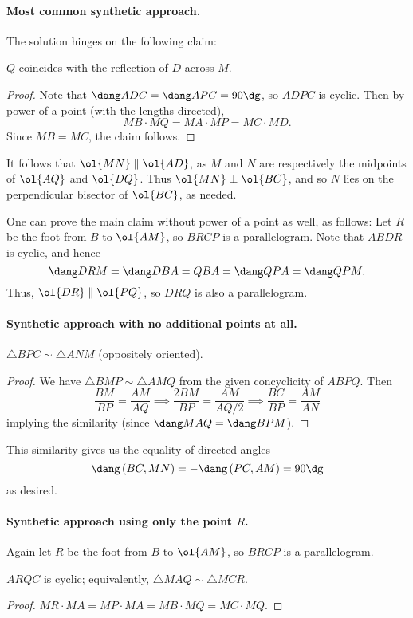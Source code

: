 \documentclass[11pt]{scrartcl}
\begin{document}
\paragraph{Most common synthetic approach.}
The solution hinges on the following claim:
\begin{claim*}
  $Q$ coincides with the reflection of $D$ across $M$.
\end{claim*}
\begin{proof}
  Note that $\dang ADC = \dang APC = 90\dg$, so $ADPC$ is cyclic.
  Then by power of a point (with the lengths directed),
  \[ MB \cdot MQ = MA \cdot MP = MC \cdot MD. \]
  Since $MB = MC$, the claim follows.
\end{proof}
It follows that $\ol{MN} \parallel \ol{AD}$,
as $M$ and $N$ are respectively the midpoints of $\ol{AQ}$ and $\ol{DQ}$.
Thus $\ol{MN} \perp \ol{BC}$,
and so $N$ lies on the perpendicular bisector of $\ol{BC}$, as needed.
\begin{remark*}
  One can prove the main claim without power of a point as well, as follows:
  Let $R$ be the foot from $B$ to $\ol{AM}$, so $BRCP$ is a parallelogram.
  Note that $ABDR$ is cyclic, and hence
  \[ \dang DRM = \dang DBA = QBA = \dang QPA = \dang QPM. \]
  Thus, $\ol{DR} \parallel \ol{PQ}$, so $DRQ$ is also a parallelogram.
\end{remark*}

\paragraph{Synthetic approach with no additional points at all.}
\begin{claim*}
  $\triangle BPC \sim \triangle ANM$ (oppositely oriented).
\end{claim*}
\begin{proof}
  We have $\triangle BMP \sim \triangle AMQ$ from the given concyclicity of $ABPQ$.
  Then
  \[ \frac{BM}{BP} = \frac{AM}{AQ} \implies
    \frac{2BM}{BP} = \frac{AM}{AQ/2} \implies
    \frac{BC}{BP} = \frac{AM}{AN} \]
  implying the similarity (since $\dang MAQ = \dang BPM$).
\end{proof}
This similarity gives us the equality of directed angles
\[ \dang \left( BC, MN \right) = -\dang \left( PC, AM  \right) = 90\dg \]
as desired.

\paragraph{Synthetic approach using only the point $R$.}
Again let $R$ be the foot from $B$ to $\ol{AM}$, so $BRCP$ is a parallelogram.
\begin{claim*}
  $ARQC$ is cyclic; equivalently, $\triangle MAQ \sim \triangle MCR$.
\end{claim*}
\begin{proof}
  $MR \cdot MA = MP \cdot MA = MB \cdot MQ = MC \cdot MQ$.
\end{proof}
\end{document}
